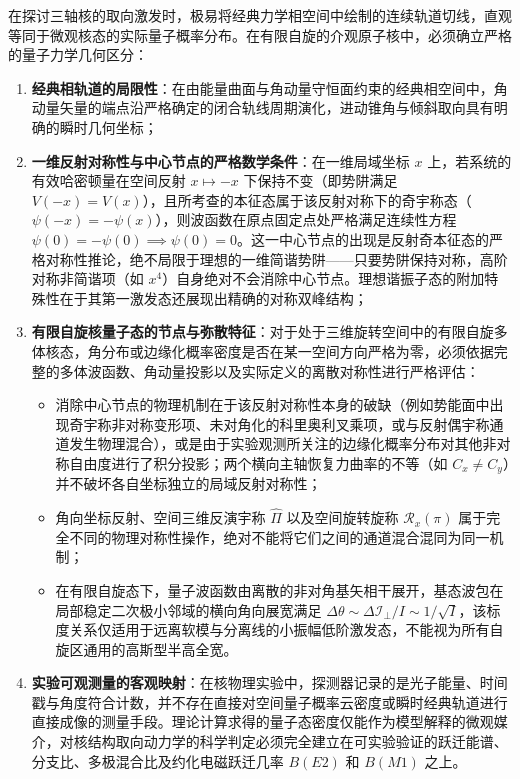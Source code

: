 在探讨三轴核的取向激发时，极易将经典力学相空间中绘制的连续轨道切线，直观等同于微观核态的实际量子概率分布。在有限自旋的介观原子核中，必须确立严格的量子力学几何区分：
\begin{enumerate}
\item \textbf{经典相轨道的局限性}：在由能量曲面与角动量守恒面约束的经典相空间中，角动量矢量的端点沿严格确定的闭合轨线周期演化，进动锥角与倾斜取向具有明确的瞬时几何坐标；
\item \textbf{一维反射对称性与中心节点的严格数学条件}：在一维局域坐标 $x$ 上，若系统的有效哈密顿量在空间反射 $x \mapsto -x$ 下保持不变（即势阱满足 $V(-x) = V(x)$），且所考查的本征态属于该反射对称下的奇宇称态（$\psi(-x) = -\psi(x)$），则波函数在原点固定点处严格满足连续性方程 $\psi(0) = -\psi(0) \implies \psi(0) = 0$。这一中心节点的出现是反射奇本征态的严格对称性推论，绝不局限于理想的一维简谐势阱——只要势阱保持对称，高阶对称非简谐项（如 $x^4$）自身绝对不会消除中心节点。理想谐振子态的附加特殊性在于其第一激发态还展现出精确的对称双峰结构；
\item \textbf{有限自旋核量子态的节点与弥散特征}：对于处于三维旋转空间中的有限自旋多体核态，角分布或边缘化概率密度是否在某一空间方向严格为零，必须依据完整的多体波函数、角动量投影以及实际定义的离散对称性进行严格评估：
\begin{itemize}
\item 消除中心节点的物理机制在于该反射对称性本身的破缺（例如势能面中出现奇宇称非对称变形项、未对角化的科里奥利叉乘项，或与反射偶宇称通道发生物理混合），或是由于实验观测所关注的边缘化概率分布对其他非对称自由度进行了积分投影；两个横向主轴恢复力曲率的不等（如 $C_x \ne C_y$）并不破坏各自坐标独立的局域反射对称性；
\item 角向坐标反射、空间三维反演宇称 $\hat{\Pi}$ 以及空间旋转旋称 $\mathcal{R}_x(\pi)$ 属于完全不同的物理对称性操作，绝对不能将它们之间的通道混合混同为同一机制；
\item 在有限自旋态下，量子波函数由离散的非对角基矢相干展开，基态波包在局部稳定二次极小邻域的横向角向展宽满足 $\Delta \theta \sim \Delta \mathcal{I}_\perp / I \sim 1/\sqrt{I}$，该标度关系仅适用于远离软模与分离线的小振幅低阶激发态，不能视为所有自旋区通用的高斯型半高全宽。
\end{itemize}
\item \textbf{实验可观测量的客观映射}：在核物理实验中，探测器记录的是光子能量、时间戳与角度符合计数，并不存在直接对空间量子概率云密度或瞬时经典轨道进行直接成像的测量手段。理论计算求得的量子态密度仅能作为模型解释的微观媒介，对核结构取向动力学的科学判定必须完全建立在可实验验证的跃迁能谱、分支比、多极混合比及约化电磁跃迁几率 $B(E2)$ 和 $B(M1)$ 之上。
\end{enumerate}

